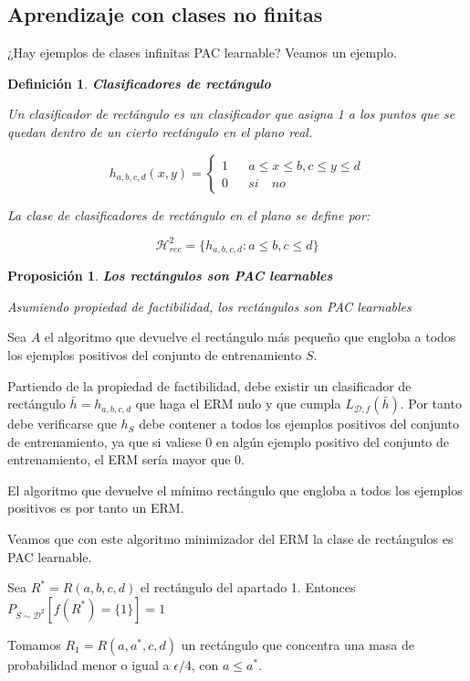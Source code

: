 \documentclass[11pt]{article}
\newtheorem{fact}{Proposición}
\newtheorem{definition}{Definición}
\begin{document}
\subsection{Aprendizaje con clases no finitas}
\label{sec-2-2}

¿Hay ejemplos de clases infinitas PAC learnable? Veamos un ejemplo.

\begin{definition}
\textbf{Clasificadores de rectángulo}

Un clasificador de rectángulo es un clasificador que asigna 1 a los puntos que se quedan dentro de un cierto rectángulo en el plano real.

\[h_{a,b,c,d}(x,y) = \left\{\begin{array}{lcl}
1 && a\le x\le b, c\le y\le d\\
0 && si \quad no
\end{array}\right.\]

La clase de clasificadores de rectángulo en el plano se define por:

\[\mathcal{H}^2_{rec} = \{ h_{a,b,c,d}: a\le b, c\le d\}\]
\end{definition}


\begin{fact}
\textbf{Los rectángulos son PAC learnables}

Asumiendo propiedad de factibilidad, los rectángulos son PAC learnables
\end{fact}

Sea $A$ el algoritmo que devuelve el rectángulo más pequeño que engloba a todos los ejemplos positivos del conjunto de entrenamiento $S$.

Partiendo de la propiedad de factibilidad, debe existir un clasificador de rectángulo $\bar{h} = h_{a,b,c,d}$ que haga el ERM nulo y que cumpla $L_{\mathcal{D},f}(\bar{h})$. Por tanto debe verificarse que $h_S$ debe contener a todos los ejemplos positivos del conjunto de entrenamiento, ya que si valiese 0 en algún ejemplo positivo del conjunto de entrenamiento, el ERM sería mayor que 0.

El algoritmo que devuelve el mínimo rectángulo que engloba a todos los ejemplos positivos es por tanto un ERM.

Veamos que con este algoritmo minimizador del ERM la clase de rectángulos es PAC learnable.

Sea $R^{\ast} = R(a,b,c,d)$ el rectángulo del apartado 1. Entonces $P_{S\sim \mathcal{D}^2}[f(R^{\ast})=\{1\}] = 1$

Tomamos $R_1 = R(a,a^{\ast},c,d)$ un rectángulo que concentra una masa de probabilidad menor o igual a $\epsilon/4$, con $a\le a^{\ast}$.
\end{document}
